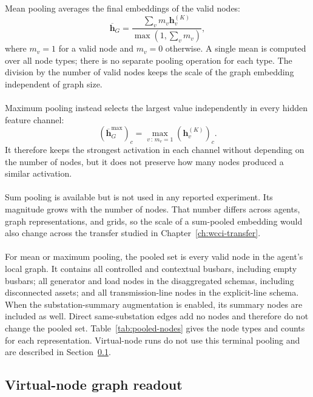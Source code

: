 Mean pooling averages the final embeddings of the valid nodes:
\begin{equation}
  \overline{\mathbf{h}}_G =
  \frac{\sum_v m_v\mathbf{h}^{(K)}_v}
       {\max(1,\sum_v m_v)},
  \label{eq:methods-mean-pooling}
\end{equation}
where $m_v=1$ for a valid node and $m_v=0$ otherwise. A single mean is computed
over all node types; there is no separate pooling operation for each type. The
division by the number of valid nodes keeps the scale of the graph embedding
independent of graph size.
\\
\\
Maximum pooling instead selects the largest value independently in every hidden
feature channel:
\begin{equation}
  \left(\overline{\mathbf{h}}^{\max}_G\right)_c =
  \max_{v\,:\,m_v=1}\left(\mathbf{h}^{(K)}_v\right)_c.
  \label{eq:methods-max-pooling}
\end{equation}
It therefore keeps the strongest activation in each channel without depending
on the number of nodes, but it does not preserve how many nodes produced a
similar activation.
\\
\\
Sum pooling is available but is not used in any reported experiment. Its
magnitude grows with the number of nodes. That number differs across agents,
graph representations, and grids, so the scale of a sum-pooled embedding would
also change across the transfer studied in Chapter~\ref{ch:wcci-transfer}.
\\
\\
For mean or maximum pooling, the pooled set is every valid node in the agent's
local graph. It contains all controlled and contextual busbars, including empty
busbars; all generator and load nodes in the disaggregated schemas, including
disconnected assets; and all transmission-line nodes in the explicit-line
schema. When the substation-summary augmentation is enabled, its summary nodes
are included as well. Direct same-substation edges add no nodes and therefore do
not change the pooled set. Table~\ref{tab:pooled-nodes} gives the node types and
counts for each representation. Virtual-node runs do not use this terminal
pooling and are described in Section~\ref{sec:virtual-node-readout}.

\subsection{Virtual-node graph readout}
\label{sec:virtual-node-readout}

